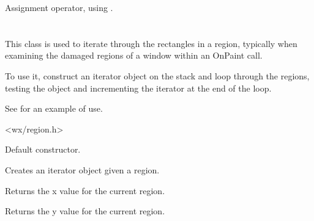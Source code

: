 
Assignment operator, using .



\section{}\label{wxregioniterator}

This class is used to iterate through the rectangles in a region,
typically when examining the damaged regions of a window within an OnPaint call.

To use it, construct an iterator object on the stack and loop through the
regions, testing the object and incrementing the iterator at the end of the loop.

See  for an example of use.




<wx/region.h>





\label{wxregioniteratorctor}


Default constructor.


Creates an iterator object given a region.


\label{wxregioniteratorgetx}


Returns the x value for the current region.


\label{wxregioniteratorgety}


Returns the y value for the current region.


\label{wxregioniteratorgetw}


